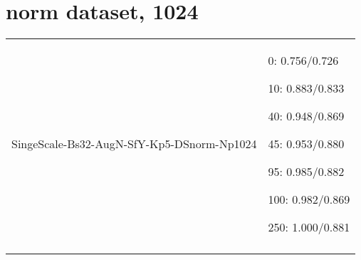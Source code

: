 \documentclass[,table,dvipsnames]{article}
\begin{document}
\section{norm dataset, 1024}
\noindent\begin{tabular}{|p{10cm}|p{5.5cm}| }	
\hline
\rowcolor{green!20}
SingeScale-Bs32-AugN-SfY-Kp5-DSnorm-Np1024&
0: 0.756/0.726\par 10: 0.883/0.833\par 40: 0.948/0.869\par 45: 0.953/0.880\par 95: 0.985/0.882\par 100: 0.982/0.869\par  250: 1.000/0.881\\
\\
\hline 	
\end{tabular}
\end{document}
